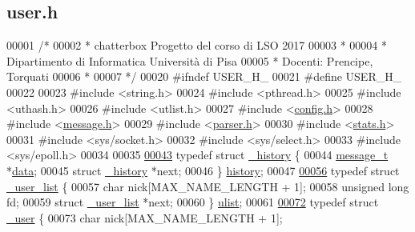 \hypertarget{user_8h_source}{}\subsection{user.\+h}

\begin{DoxyCode}
00001 \textcolor{comment}{/*}
00002 \textcolor{comment}{ * chatterbox Progetto del corso di LSO 2017}
00003 \textcolor{comment}{ *}
00004 \textcolor{comment}{ * Dipartimento di Informatica Università di Pisa}
00005 \textcolor{comment}{ * Docenti: Prencipe, Torquati}
00006 \textcolor{comment}{ *}
00007 \textcolor{comment}{ */}
00020 \textcolor{preprocessor}{#ifndef USER\_H\_}
00021 \textcolor{preprocessor}{#define USER\_H\_}
00022 
00023 \textcolor{preprocessor}{#include <string.h>}
00024 \textcolor{preprocessor}{#include <pthread.h>}
00025 \textcolor{preprocessor}{#include <uthash.h>}
00026 \textcolor{preprocessor}{#include <utlist.h>}
00027 \textcolor{preprocessor}{#include <\mbox{\hyperlink{config_8h}{config.h}}>}
00028 \textcolor{preprocessor}{#include <\mbox{\hyperlink{message_8h}{message.h}}>}
00029 \textcolor{preprocessor}{#include <\mbox{\hyperlink{parser_8h}{parser.h}}>}
00030 \textcolor{preprocessor}{#include <\mbox{\hyperlink{stats_8h}{stats.h}}>}
00031 \textcolor{preprocessor}{#include <sys/socket.h>}
00032 \textcolor{preprocessor}{#include <sys/select.h>}
00033 \textcolor{preprocessor}{#include <sys/epoll.h>}
00034 
00035 
\mbox{\hyperlink{struct__history}{00043}} \textcolor{keyword}{typedef} \textcolor{keyword}{struct }\mbox{\hyperlink{struct__history}{\_history}} \{
00044   \mbox{\hyperlink{structmessage__t}{message\_t}} *\mbox{\hyperlink{structdata}{data}};
00045   \textcolor{keyword}{struct }\mbox{\hyperlink{struct__history}{\_history}} *next;
00046 \} \mbox{\hyperlink{struct__history}{history}};
00047 
\mbox{\hyperlink{struct__user__list}{00056}} \textcolor{keyword}{typedef} \textcolor{keyword}{struct }\mbox{\hyperlink{struct__user__list}{\_user\_list}} \{
00057   \textcolor{keywordtype}{char} nick[MAX\_NAME\_LENGTH + 1];
00058   \textcolor{keywordtype}{unsigned} \textcolor{keywordtype}{long} fd;
00059   \textcolor{keyword}{struct }\mbox{\hyperlink{struct__user__list}{\_user\_list}} *next;
00060 \} \mbox{\hyperlink{struct__user__list}{ulist}};
00061 
\mbox{\hyperlink{struct__user}{00072}} \textcolor{keyword}{typedef} \textcolor{keyword}{struct }\mbox{\hyperlink{struct__user}{\_user}} \{
00073   \textcolor{keywordtype}{char} nick[MAX\_NAME\_LENGTH + 1];

\end{DoxyCode}
